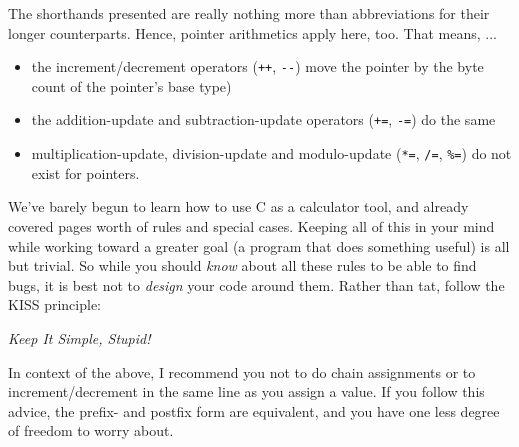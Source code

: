{{{{\begin{hintbox}
The shorthands presented are really nothing more than abbreviations for their longer counterparts. Hence, pointer arithmetics apply here, too. That means, ...
\begin{itemize}
\item the increment/decrement operators (\texttt{++}, \texttt{-{}-}) move the pointer by the byte count of the pointer's base type)
\item the addition-update and subtraction-update operators (\texttt{+=}, \texttt{-=}) do the same
\item multiplication-update, division-update and modulo-update (\texttt{*=}, \texttt{/=}, \texttt{\%=}) do not exist for pointers.
\end{itemize}
\end{hintbox}

\begin{hintbox}
We've barely begun to learn how to use C as a calculator tool, and already covered pages worth of rules and special cases. Keeping all of this in your mind while working toward a greater goal (a program that does something useful) is all but trivial. So while you should \emph{know} about all these rules to be able to find bugs, it is best not to \emph{design} your code around them. Rather than tat, follow the KISS principle:

\begin{center}
	\emph{Keep It Simple, Stupid!}
\end{center}

In context of the above, I recommend you not to do chain assignments or to increment/decrement in the same line as you assign a value. If you follow this advice, the prefix- and postfix form are equivalent, and you have one less degree of freedom to worry about.
\end{hintbox}


}}}}
